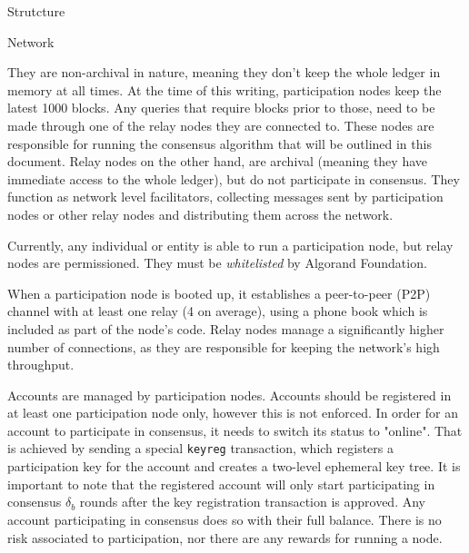 \documentclass[10pt,a4paper]{article}
\begin{document}
\begin{section}{Strutcture}
\begin{subsection}{Network}

They are non-archival in nature, meaning they don't keep
the whole ledger in memory at all times. At the time of this writing,
participation nodes keep the latest 1000 blocks.
Any queries that require blocks prior to those, need to be made
through one of the relay nodes they are connected to.
These nodes are responsible for running the consensus algorithm that
will be outlined in this document.
Relay nodes on the other hand, are archival (meaning they have immediate
access to the whole ledger), but do not participate in consensus.
They function as network level facilitators, collecting messages sent by participation
nodes or other relay nodes and distributing them across the network.

Currently, any individual or entity is able to run a participation node, 
but relay nodes are permissioned. They must be {\em whitelisted} by 
Algorand Foundation.

When a participation node is booted up, it establishes a peer-to-peer (P2P) 
channel with at least one relay (4 on average), using a phone book which is included
as part of the node's code. 
Relay nodes manage a significantly higher number of connections, as they 
are responsible for keeping the network's high throughput.

Accounts are managed by participation nodes. Accounts should be registered in at least one participation
node only, however this is not enforced.
In order for an account to participate in consensus, it needs to switch its status to "online". 
That is achieved by sending a special {\tt keyreg} transaction,
which registers a participation key for the account and creates a two-level ephemeral key tree.
It is important to note that the registered account will only start participating in consensus
$\delta_b$ rounds after the key registration transaction is approved.
Any account participating in consensus does so with their full balance. There is no risk
associated to participation, nor there are any rewards for running a node.



\end{subsection}
\end{section}
\end{document}
